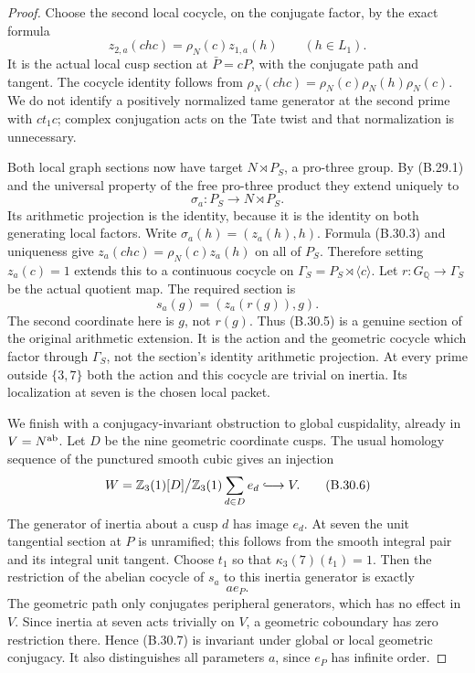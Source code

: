 \begin{proof}
Choose the second local cocycle, on the conjugate factor,
by the exact formula
\[
                 z_{2,a}(chc)=\rho_N(c)z_{1,a}(h)
                         \qquad(h\in L_1).                    \tag{B.30.3}
\]
It is the actual local cusp section at $\bar P=cP$,
with the conjugate path and tangent.  The cocycle identity
follows from
$\rho_N(chc)=\rho_N(c)\rho_N(h)\rho_N(c)$.
We do not identify a positively normalized tame generator at
the second prime with $ct_1c$; complex conjugation acts on
the Tate twist and that normalization is unnecessary.

Both local graph sections now have target $N\rtimes P_S$,
a pro-three group.  By (B.29.1) and the universal property of
the free pro-three product they extend uniquely to
\[
            \sigma_a:P_S\longrightarrow N\rtimes P_S.
                                                               \tag{B.30.4}
\]
Its arithmetic projection is the identity, because it is
the identity on both generating local factors.  Write
$\sigma_a(h)=(z_a(h),h)$.  Formula (B.30.3) and uniqueness
give $z_a(chc)=\rho_N(c)z_a(h)$ on all of $P_S$.
Therefore setting $z_a(c)=1$ extends this to a continuous
cocycle on $\Gamma_S=P_S\rtimes\langle c\rangle$.
Let $r:G_{\mathbb Q}\to\Gamma_S$ be the actual quotient map.
The required section is
\[
                  s_a(g)=(z_a(r(g)),g).                       \tag{B.30.5}
\]
The second coordinate here is $g$, not $r(g)$.
Thus (B.30.5) is a genuine section of the original arithmetic
extension.  It is the action and the geometric cocycle which
factor through $\Gamma_S$, not the section's identity
arithmetic projection.  At every prime outside $\{3,7\}$
both the action and this cocycle are trivial on inertia.
Its localization at seven is the chosen local packet.

We finish with a conjugacy-invariant obstruction to global
cuspidality, already in $V=N^{\rm ab}$.
Let $D$ be the nine geometric coordinate cusps.  The usual
homology sequence of the punctured smooth cubic gives an
injection
\[
 W=\mathbb Z_3(1)[D]\big/
          \mathbb Z_3(1)\sum_{d\in D}e_d
           \lhook\joinrel\longrightarrow V.                  \tag{B.30.6}
\]
The generator of inertia about a cusp $d$ has image $e_d$.
At seven the unit tangential section at $P$ is unramified;
this follows from the smooth integral pair and its integral
unit tangent.  Choose $t_1$ so that $\kappa_3(7)(t_1)=1$.
Then the restriction of the abelian cocycle of $s_a$ to
this inertia generator is exactly
\[
                               a e_P.                        \tag{B.30.7}
\]
The geometric path only conjugates peripheral generators,
which has no effect in $V$.
Since inertia at seven acts trivially on $V$, a geometric
coboundary has zero restriction there.  Hence (B.30.7) is
invariant under global or local geometric conjugacy.
It also distinguishes all parameters $a$, since $e_P$
has infinite order.


\end{proof}
